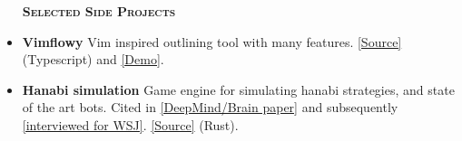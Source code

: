 \documentclass[11 pt]{article}
\begin{document}
\begin{itemize}







\begin{center}\begin{large}\textsc{\textbf{Selected Side Projects}\\}\end{large}\end{center}
 \setlength\itemsep{0em}
\item \textbf{Vimflowy}
Vim inspired outlining tool with many features. \href{https://github.com/WuTheFWasThat/vimflowy}{[Source]} (Typescript) and \href{https://wuthejeff.com/vimflowy}{[Demo]}.
\item \textbf{Hanabi simulation}
  Game engine for simulating hanabi strategies, and state of the art bots.  Cited in \href{https://arxiv.org/abs/1902.00506}{[DeepMind/Brain paper]} and subsequently \href{https://www.wsj.com/articles/why-the-card-game-hanabi-is-the-next-big-hurdle-for-artificial-intelligence-11553875351?mod=rsswn}{[interviewed for WSJ]}. \href{https://github.com/WuTheFWasThat/hanabi.rs}{[Source]} (Rust).


\end{itemize}
\end{document}
